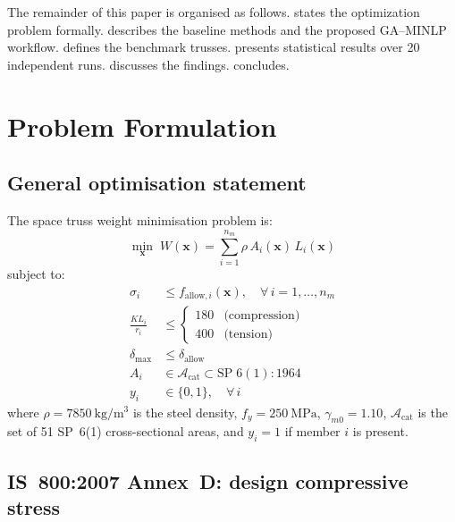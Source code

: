 \documentclass[lineno,pdflatex,sn-mathphys-num]{sn-jnl}
\begin{document}
The remainder of this paper is organised as follows.
 states the optimization problem formally.
 describes the baseline methods and the proposed
GA--MINLP workflow.
 defines the benchmark trusses.
 presents statistical results over 20 independent runs.
 discusses the findings.
 concludes.


\section{Problem Formulation}
\label{sec:problem}

\subsection{General optimisation statement}

The space truss weight minimisation problem is:
\begin{equation}
  \min_{\mathbf{x}}\; W(\mathbf{x})
  = \sum_{i=1}^{n_m} \rho\,A_i(\mathbf{x})\,L_i(\mathbf{x})
  \label{eq:objective}
\end{equation}
subject to:
\begin{align}
  \sigma_i &\leq f_{\mathrm{allow},i}(\mathbf{x}),
    \quad \forall\,i = 1,\ldots,n_m
    \tag{stress} \label{eq:stress} \\
  \frac{KL_i}{r_i} &\leq
    \begin{cases}180 & \text{(compression)}\\400 & \text{(tension)}\end{cases}
    \tag{slenderness / IS~800 Cl.~7.1} \label{eq:slend} \\
  \delta_{\max} &\leq \delta_{\mathrm{allow}}
    \tag{deflection} \label{eq:defl} \\
  A_i &\in \mathcal{A}_{\mathrm{cat}} \subset \mathrm{SP\;6(1):1964}
    \tag{discrete catalogue} \label{eq:disc} \\
  y_i &\in \{0,1\},\quad \forall\,i
    \tag{topology} \label{eq:topo}
\end{align}
where $\rho = 7850~\mathrm{kg/m^3}$ is the steel density,
$f_y = 250~\mathrm{MPa}$, $\gamma_{m0} = 1.10$,
$\mathcal{A}_{\mathrm{cat}}$ is the set of 51 SP~6(1) cross-sectional
areas, and $y_i=1$ if member $i$ is present.

\subsection{IS~800:2007 Annex~D: design compressive stress}
\end{document}
